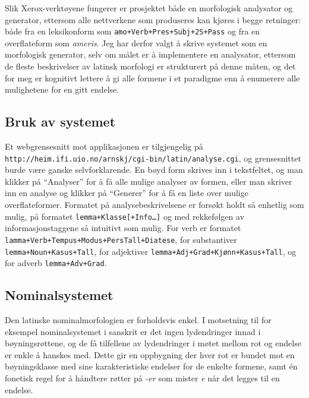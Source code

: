 \documentclass{article}
\newcommand\form[1]{\texttt{#1}}
\newcommand\note[1]{\marginpar{\raggedright\tiny#1}}
\newcommand\w[1]{\emph{#1}}
\begin{document}
Slik Xerox-verkt\o{}yene fungerer er prosjektet b\aa{}de en morfologisk
analysator og generator, ettersom alle nettverkene som produseres kan
kj\o{}res i begge retninger: b\aa{}de fra en leksikonform som
\form{amo+Verb+Pres+Subj+2S+Pass} og fra en overflateform som \w{ameris}. Jeg
har derfor valgt \aa{} skrive systemet som en morfologisk generator, selv om
m\aa{}let er \aa{} implementere en analysator, ettersom de fleste beskrivelser
av latinsk morfologi er strukturert p\aa{} denne m\aa{}ten, og det for meg er
kognitivt lettere \aa{} gi alle formene i et paradigme enn \aa{} enumerere
alle mulighetene for en gitt endelse.

\subsection{Bruk av systemet}\note{Dette m\aa{} plasseres et annet sted.}
Et webgrensesnitt mot applikasjonen er tilgjengelig p\aa{}
\texttt{http://heim.ifi.uio.no/arnskj/cgi-bin/latin/analyse.cgi}, og
grensesnittet burde v\ae{}re ganske selvforklarende. En b\o{}yd form skrives
inn i tekstfeltet, og man klikker p\aa{} ``Analyser'' for \aa{} f\aa{} alle
mulige analyser av formen, eller man skriver inn en analyse og klikker p\aa{}
``Generer'' for \aa{} f\aa{} en liste over mulige overflateformer. Formatet
p\aa{} analysebeskrivelsene er fors\o{}kt holdt s\aa{} enhetlig som mulig,
p\aa{} formatet \form{lemma+Klasse[+Info\ldots]} og med rekkef\o{}lgen av
informasjonstaggene s\aa{} intuitivt som mulig. For verb er formatet
\form{lamma+Verb+Tempus+Modus+PersTall+Diatese}, for substantiver
\form{lemma\-+Noun\-+Kasus\-+Tall}, for adjektiver
\form{lemma+Adj+Grad\-+Kj\o{}nn+Kasus+Tall}, og for adverb
\form{lemma+Adv+Grad}.

\subsection{Nominalsystemet}
\label{deklinasjon}
Den latinske nominalmorfologien er forholdsvis enkel. I motsetning til for
eksempel nominalsystemet i sanskrit er det ingen lydendringer innad i
b\o{}yningsr\o{}ttene, og de f\aa{} tilfellene av lydendringer i m\o{}tet
mellom rot og endelse er enkle \aa{} hanskes med. Dette gir en oppbygning der
hver rot er bundet mot en b\o{}yningsklasse med sine karakteristiske endelser
for de enkelte formene, samt \'en fonetisk regel for \aa{} h\aa{}ndtere
r\o{}tter p\aa{} \w{-er} som mister \w{e} n\aa{}r det legges til en endelse.
\end{document}
